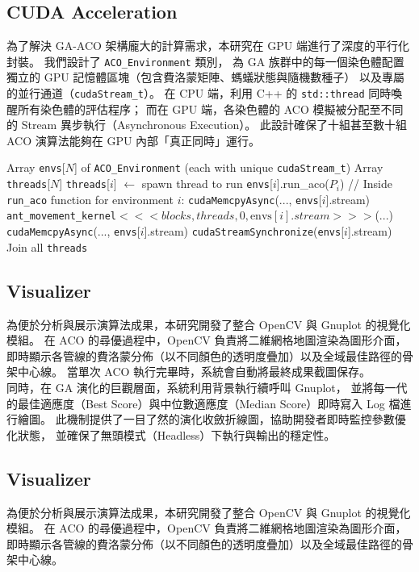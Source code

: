 \documentclass[conference]{IEEEtran}
\begin{document}
\subsection{CUDA Acceleration}
為了解決 GA-ACO 架構龐大的計算需求，本研究在 GPU 端進行了深度的平行化封裝。
我們設計了 \texttt{ACO\_Environment} 類別，
為 GA 族群中的每一個染色體配置獨立的 GPU 記憶體區塊（包含費洛蒙矩陣、螞蟻狀態與隨機數種子）
以及專屬的並行通道（\texttt{cudaStream\_t}）。
在 CPU 端，利用 C++ 的 \texttt{std::thread} 同時喚醒所有染色體的評估程序；
而在 GPU 端，各染色體的 ACO 模擬被分配至不同的 Stream 異步執行（Asynchronous Execution）。
此設計確保了十組甚至數十組 ACO 演算法能夠在 GPU 內部「真正同時」運行。

\begin{algorithm}[!t]
\caption{Multi-Stream CUDA Execution Architecture}
\begin{algorithmic}[1]
\STATE Array \texttt{envs}[$N$] of \texttt{ACO\_Environment} (each with unique \texttt{cudaStream\_t})
\STATE Array \texttt{threads}[$N$]
    \STATE \texttt{threads}[$i$] $\leftarrow$ spawn thread to run \texttt{envs}[$i$].run\_aco($P_i$)
\ENDFOR
\STATE // Inside \texttt{run\_aco} function for environment $i$:
\STATE \texttt{cudaMemcpyAsync}(..., \texttt{envs}[$i$].stream)
\STATE \texttt{ant\_movement\_kernel}$<<<blocks, threads, 0, \text{envs}[i].stream>>>$(...)
\STATE \texttt{cudaMemcpyAsync}(..., \texttt{envs}[$i$].stream)
\STATE \texttt{cudaStreamSynchronize}(\texttt{envs}[$i$].stream)
\STATE Join all \texttt{threads}
\end{algorithmic}
\end{algorithm}


\subsection{Visualizer}
為便於分析與展示演算法成果，本研究開發了整合 OpenCV 與 Gnuplot 的視覺化模組。
在 ACO 的尋優過程中，OpenCV 負責將二維網格地圖渲染為圖形介面，
即時顯示各管線的費洛蒙分佈（以不同顏色的透明度疊加）以及全域最佳路徑的骨架中心線。
當單次 ACO 執行完畢時，系統會自動將最終成果截圖保存。\\
同時，在 GA 演化的巨觀層面，系統利用背景執行續呼叫 Gnuplot，
並將每一代的最佳適應度（Best Score）與中位數適應度（Median Score）即時寫入 Log 檔進行繪圖。
此機制提供了一目了然的演化收斂折線圖，協助開發者即時監控參數優化狀態，
並確保了無頭模式（Headless）下執行與輸出的穩定性。
\subsection{Visualizer}
為便於分析與展示演算法成果，本研究開發了整合 OpenCV 與 Gnuplot 的視覺化模組。
在 ACO 的尋優過程中，OpenCV 負責將二維網格地圖渲染為圖形介面，
即時顯示各管線的費洛蒙分佈（以不同顏色的透明度疊加）以及全域最佳路徑的骨架中心線。
\end{document}
